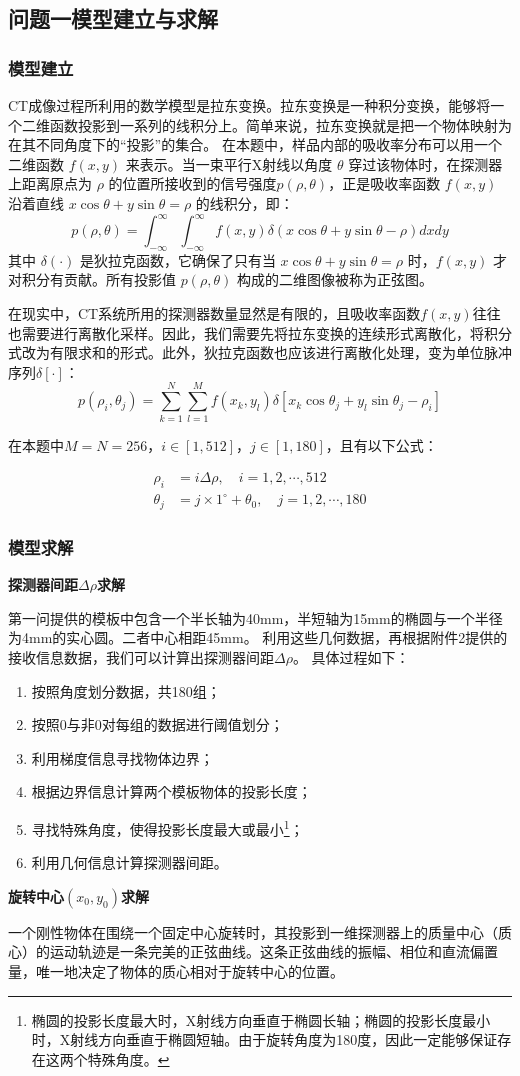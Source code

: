 \subsection{问题一模型建立与求解}
\subsubsection{模型建立}
CT成像过程所利用的数学模型是拉东变换。拉东变换是一种积分变换，能够将一个二维函数投影到一系列的线积分上。简单来说，拉东变换就是把一个物体映射为在其不同角度下的“投影”的集合。
在本题中，样品内部的吸收率分布可以用一个二维函数 $f(x,y)$ 来表示。当一束平行X射线以角度 $\theta$ 穿过该物体时，在探测器上距离原点为 $\rho$ 的位置所接收到的信号强度$p(\rho,\theta)$，正是吸收率函数 $f(x,y)$ 沿着直线 $x\cos\theta+y\sin\theta=\rho$ 的线积分，即：
$$p(\rho,\theta)=\int_{-\infty}^{\infty}\int_{-\infty}^{\infty}f(x,y)\delta(x\cos\theta+y\sin\theta-\rho)dxdy$$
其中 $\delta(\cdot)$ 是狄拉克函数，它确保了只有当 $x\cos\theta+y\sin\theta=\rho$ 时，$f(x,y)$ 才对积分有贡献。所有投影值 $p(\rho,\theta)$ 构成的二维图像被称为正弦图。

在现实中，CT系统所用的探测器数量显然是有限的，且吸收率函数$f(x,y)$往往也需要进行离散化采样。因此，我们需要先将拉东变换的连续形式离散化，将积分式改为有限求和的形式。此外，狄拉克函数也应该进行离散化处理，变为单位脉冲序列$\delta[\cdot]$：
$$p(\rho_i,\theta_j)=\sum_{k=1}^{N}\sum_{l=1}^{M}f(x_k,y_l)\delta[x_k\cos\theta_j+y_l\sin\theta_j-\rho_i]$$

在本题中$M=N=256$，$i \in [1,512]$，$j \in [1,180]$，且有以下公式：

\begin{equation*}
    \begin{aligned}
        \rho_i &= i\Delta\rho, \quad i=1,2,\cdots,512 \\
        \theta_j &= j\times 1^\circ+\theta_0, \quad j=1,2,\cdots,180
    \end{aligned}
\end{equation*}

\subsubsection{模型求解}
\textbf{探测器间距$\Delta\rho$求解}
\par
第一问提供的模板中包含一个半长轴为40mm，半短轴为15mm的椭圆与一个半径为4mm的实心圆。二者中心相距45mm。
利用这些几何数据，再根据附件2提供的接收信息数据，我们可以计算出探测器间距$\Delta\rho$。
具体过程如下：
\begin{enumerate}
    \item 按照角度划分数据，共180组；
    \item 按照0与非0对每组的数据进行阈值划分；
    \item 利用梯度信息寻找物体边界；
    \item 根据边界信息计算两个模板物体的投影长度；
    \item 寻找特殊角度，使得投影长度最大或最小\footnote{椭圆的投影长度最大时，X射线方向垂直于椭圆长轴；椭圆的投影长度最小时，X射线方向垂直于椭圆短轴。由于旋转角度为180度，因此一定能够保证存在这两个特殊角度。}；
    \item 利用几何信息计算探测器间距。
\end{enumerate}


\textbf{旋转中心$(x_0,y_0)$求解}
\par
一个刚性物体在围绕一个固定中心旋转时，其投影到一维探测器上的质量中心（质心）的运动轨迹是一条完美的正弦曲线。这条正弦曲线的振幅、相位和直流偏置量，唯一地决定了物体的质心相对于旋转中心的位置。

